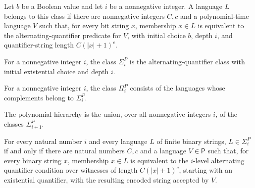 \begin{definition}
\label{Complexity.altClass}
\leanok
{}
Let $b$ be a Boolean value and let $i$ be a nonnegative integer. A language $L$ belongs
to this class if there are nonnegative integers $C,c$ and a polynomial-time language $V$
such that, for every bit string $x$, membership $x\in L$ is equivalent to the
alternating-quantifier predicate for $V$, with initial choice $b$, depth $i$, and
quantifier-string length $C(|x|+1)^c$.
\end{definition}

\begin{definition}
\label{Complexity.SigmaP}
\leanok
{}
For a nonnegative integer $i$, the class $\Sigma_i^P$ is the alternating-quantifier
class with initial existential choice and depth $i$.
\end{definition}

\begin{definition}
\label{Complexity.PiP}
\leanok
{}
For a nonnegative integer $i$, the class $\Pi_i^P$ consists of the languages whose
complements belong to $\Sigma_i^P$.
\end{definition}

\begin{definition}
\label{Complexity.PH}
\leanok
{}
The polynomial hierarchy is the union, over all nonnegative integers $i$, of the classes
$\Sigma_{i+1}^P$.
\end{definition}

\begin{theorem}
\label{Complexity.mem_SigmaP_iff}
\leanok
{}
For every natural number $i$ and every language $L$ of finite binary strings,
$L\in\Sigma_i^P$ if and only if there are natural numbers $C,c$ and a language
$V\in\mathsf{P}$ such that, for every binary string $x$, membership $x\in L$ is
equivalent to the $i$-level alternating quantifier condition over witnesses of length
$C(|x|+1)^c$, starting with an existential quantifier, with the resulting encoded string
accepted by $V$.
\end{theorem}

